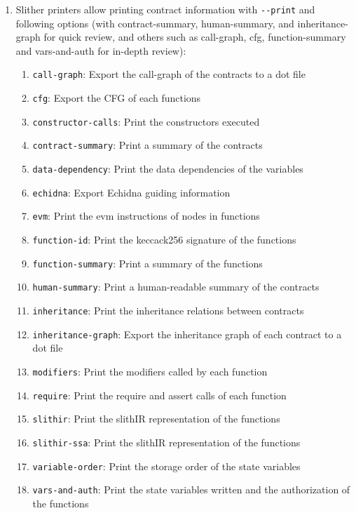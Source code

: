 \begin{enumerate}
\item Slither printers allow printing contract information with \verb|--print| and following options (with contract-summary, human-summary, and inheritance-graph for quick review, and others such as call-graph, cfg, function-summary and vars-and-auth for in-depth review):
	\begin{enumerate}
	\item\verb|call-graph|: Export the call-graph of the contracts to a dot file
	\item\verb|cfg|: Export the CFG of each functions
	\item\verb|constructor-calls|: Print the constructors executed
	\item\verb|contract-summary|: Print a summary of the contracts
	\item\verb|data-dependency|: Print the data dependencies of the variables
	\item\verb|echidna|: Export Echidna guiding information
	\item\verb|evm|: Print the evm instructions of nodes in functions
	\item\verb|function-id|: Print the keccack256 signature of the functions
	\item\verb|function-summary|: Print a summary of the functions
	\item\verb|human-summary|: Print a human-readable summary of the contracts
	\item\verb|inheritance|: Print the inheritance relations between contracts
	\item\verb|inheritance-graph|: Export the inheritance graph of each contract to a dot file
	\item\verb|modifiers|: Print the modifiers called by each function
	\item\verb|require|: Print the require and assert calls of each function
	\item\verb|slithir|: Print the slithIR representation of the functions
	\item\verb|slithir-ssa|: Print the slithIR representation of the functions
	\item\verb|variable-order|: Print the storage order of the state variables
	\item\verb|vars-and-auth|: Print the state variables written and the authorization of the functions
	\end{enumerate}


\end{enumerate}
